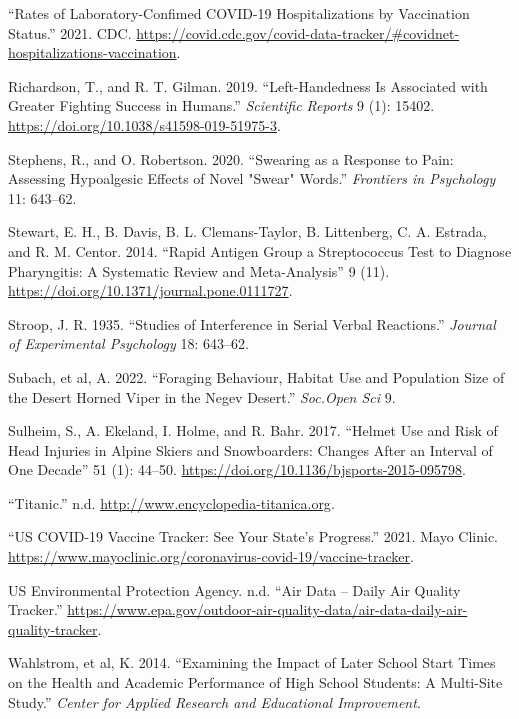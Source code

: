 \documentclass[
]{report}
\newlength{\cslhangindent}
\newenvironment{CSLReferences}[2] %
 {\begin{list}{}{%
  \setlength{\itemindent}{0pt}
  \setlength{\leftmargin}{0pt}
  \setlength{\parsep}{0pt}
  \ifodd #1
   \setlength{\leftmargin}{\cslhangindent}
   \setlength{\itemindent}{-1\cslhangindent}
  \fi
  \setlength{\itemsep}{#2\baselineskip}}}
 {\end{list}}
\begin{document}
\begin{CSLReferences}{1}{0}
{``Rates of Laboratory-Confimed COVID-19 Hospitalizations by Vaccination Status.''} 2021. CDC. \url{https://covid.cdc.gov/covid-data-tracker/\#covidnet-hospitalizations-vaccination}.

Richardson, T., and R. T. Gilman. 2019. {``Left-Handedness Is Associated with Greater Fighting Success in Humans.''} \emph{Scientific Reports} 9 (1): 15402. \url{https://doi.org/10.1038/s41598-019-51975-3}.

Stephens, R., and O. Robertson. 2020. {``Swearing as a Response to Pain: Assessing Hypoalgesic Effects of Novel "Swear" Words.''} \emph{Frontiers in Psychology} 11: 643--62.

Stewart, E. H., B. Davis, B. L. Clemans-Taylor, B. Littenberg, C. A. Estrada, and R. M. Centor. 2014. {``Rapid Antigen Group a Streptococcus Test to Diagnose Pharyngitis: A Systematic Review and Meta-Analysis''} 9 (11). \url{https://doi.org/10.1371/journal.pone.0111727}.

Stroop, J. R. 1935. {``Studies of Interference in Serial Verbal Reactions.''} \emph{Journal of Experimental Psychology} 18: 643--62.

Subach, et al, A. 2022. {``Foraging Behaviour, Habitat Use and Population Size of the Desert Horned Viper in the Negev Desert.''} \emph{Soc.Open Sci} 9.

Sulheim, S., A. Ekeland, I. Holme, and R. Bahr. 2017. {``Helmet Use and Risk of Head Injuries in Alpine Skiers and Snowboarders: Changes After an Interval of One Decade''} 51 (1): 44--50. \url{https://doi.org/10.1136/bjsports-2015-095798}.

{``Titanic.''} n.d. \url{http://www.encyclopedia-titanica.org}.

{``US COVID-19 Vaccine Tracker: See Your State's Progress.''} 2021. Mayo Clinic. \url{https://www.mayoclinic.org/coronavirus-covid-19/vaccine-tracker}.

US Environmental Protection Agency. n.d. {``Air Data -- Daily Air Quality Tracker.''} \url{https://www.epa.gov/outdoor-air-quality-data/air-data-daily-air-quality-tracker}.

Wahlstrom, et al, K. 2014. {``Examining the Impact of Later School Start Times on the Health and Academic Performance of High School Students: A Multi-Site Study.''} \emph{Center for Applied Research and Educational Improvement}.


\end{CSLReferences}
\end{document}
